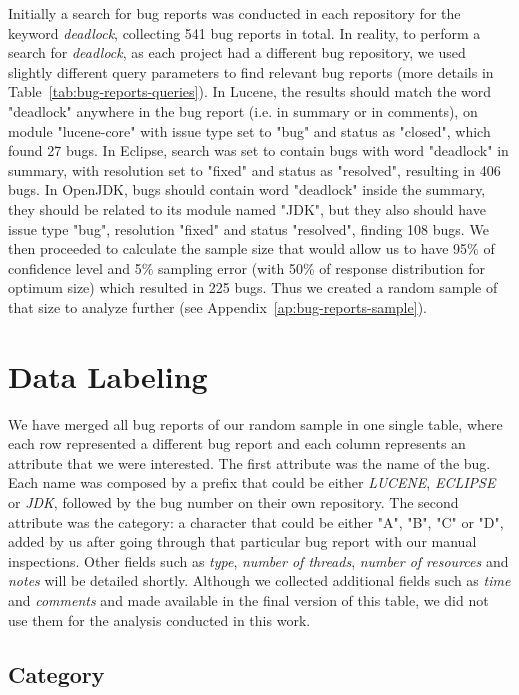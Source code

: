 Initially a search for bug reports was conducted in each repository for the keyword \emph{deadlock}, collecting 541 bug reports in total.
In reality, to perform a search for \emph{deadlock}, as each project had a different bug repository,
we used slightly different query parameters to find relevant bug reports (more details in Table~\ref{tab:bug-reports-queries}).
In Lucene, the results should match the word "deadlock" anywhere in the bug report (i.e. in summary or in comments), on module "lucene-core" with issue type set to "bug" and status as "closed", which found 27 bugs.
In Eclipse, search was set to contain bugs with word "deadlock" in summary, with resolution set to "fixed" and status as "resolved", resulting in 406 bugs.
In OpenJDK, bugs should contain word "deadlock" inside the summary, they should be related to its module named "JDK", but they also should have issue type "bug", resolution "fixed" and status "resolved", finding 108 bugs.
We then proceeded to calculate the sample size that would allow us to have 95\% of confidence level and 5\% sampling error (with 50\% of response distribution for optimum size) which resulted in 225 bugs.
Thus we created a random sample of that size to analyze further (see Appendix~\ref{ap:bug-reports-sample}).

\section{Data Labeling}

We have merged all bug reports of our random sample in one single table, where each row represented a different bug report and each column represents an attribute that we were interested.
The first attribute was the name of the bug. Each name was composed by a prefix that could be either \emph{LUCENE}, \emph{ECLIPSE} or \emph{JDK}, followed by the bug number on their own repository.
The second attribute was the category: a character that could be either "A", "B", "C" or "D", added by us after going through that particular bug report with our manual inspections.
Other fields such as \emph{type}, \emph{number of threads}, \emph{number of resources} and \emph{notes} will be detailed shortly. Although we collected additional fields such as \emph{time} and \emph{comments} and made available in the final version of this table, we did not use them for the analysis conducted in this work.

\subsection{Category}

